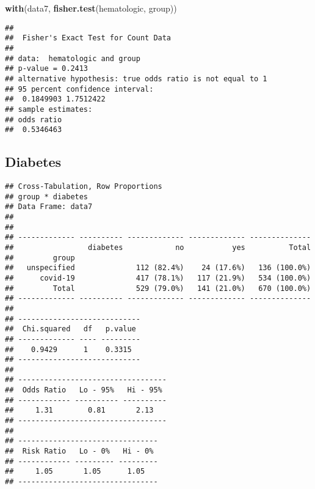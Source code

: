 \documentclass[
]{article}
\newenvironment{Shaded}{\begin{snugshade}}{\end{snugshade}}
\newcommand{\DataTypeTok}[1]{\textcolor[rgb]{0.13,0.29,0.53}{#1}}
\newcommand{\KeywordTok}[1]{\textcolor[rgb]{0.13,0.29,0.53}{\textbf{#1}}}
\newcommand{\NormalTok}[1]{#1}
\newcommand{\OperatorTok}[1]{\textcolor[rgb]{0.81,0.36,0.00}{\textbf{#1}}}
\newcommand{\OtherTok}[1]{\textcolor[rgb]{0.56,0.35,0.01}{#1}}
\newcommand{\StringTok}[1]{\textcolor[rgb]{0.31,0.60,0.02}{#1}}
\begin{document}
\begin{Shaded}
\begin{Highlighting}[]
\KeywordTok{with}\NormalTok{(data7, }\KeywordTok{fisher.test}\NormalTok{(hematologic, group))}
\end{Highlighting}
\end{Shaded}

\begin{verbatim}
## 
##  Fisher's Exact Test for Count Data
## 
## data:  hematologic and group
## p-value = 0.2413
## alternative hypothesis: true odds ratio is not equal to 1
## 95 percent confidence interval:
##  0.1849903 1.7512422
## sample estimates:
## odds ratio 
##  0.5346463
\end{verbatim}

\hypertarget{diabetes}{%
\subsection{Diabetes}\label{diabetes}}

\begin{Shaded}
\end{Shaded}

\begin{verbatim}
## Cross-Tabulation, Row Proportions  
## group * diabetes  
## Data Frame: data7  
## 
## 
## ------------- ---------- ------------- ------------- --------------
##                 diabetes            no           yes          Total
##         group                                                      
##   unspecified              112 (82.4%)    24 (17.6%)   136 (100.0%)
##      covid-19              417 (78.1%)   117 (21.9%)   534 (100.0%)
##         Total              529 (79.0%)   141 (21.0%)   670 (100.0%)
## ------------- ---------- ------------- ------------- --------------
## 
## ----------------------------
##  Chi.squared   df   p.value 
## ------------- ---- ---------
##    0.9429      1    0.3315  
## ----------------------------
## 
## ----------------------------------
##  Odds Ratio   Lo - 95%   Hi - 95% 
## ------------ ---------- ----------
##     1.31        0.81       2.13   
## ----------------------------------
## 
## --------------------------------
##  Risk Ratio   Lo - 0%   Hi - 0% 
## ------------ --------- ---------
##     1.05       1.05      1.05   
## --------------------------------
\end{verbatim}
\end{document}
